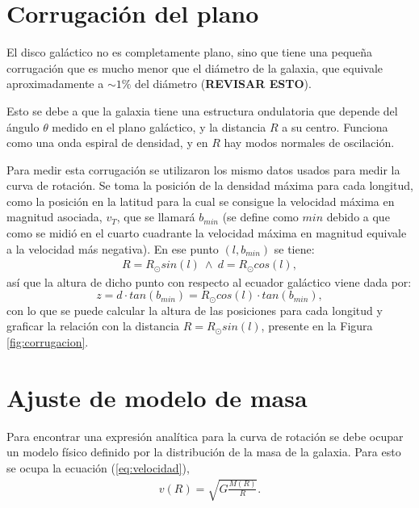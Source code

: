 \documentclass[letterpaper,oneside]{article}
\begin{document}
\section{Corrugación del plano}
El disco galáctico no es completamente plano, sino que tiene una pequeña corrugación que es mucho menor que el diámetro de la galaxia, que equivale aproximadamente a  $\sim 1\%$ del diámetro (\textbf{REVISAR ESTO}).

Esto se debe a que la galaxia tiene una estructura ondulatoria que depende del ángulo $\theta$ medido en el plano galáctico, y la distancia $R$ a su centro. Funciona como una onda espiral de densidad, y en $R$ hay modos normales de oscilación. %

Para medir esta corrugación se utilizaron los mismo datos usados para medir la curva de rotación. Se toma la posición de la densidad máxima para cada longitud, como la posición en la latitud para la cual se consigue la velocidad máxima en magnitud asociada, $v_{T}$, que se llamará $b_{min}$ (se define como $min$ debido a que como se midió en el cuarto cuadrante la velocidad máxima en magnitud equivale a la velocidad más negativa). En ese punto $(l,b_{min})$ se tiene:
\begin{gather*}
R=R_{\odot}sin(l) \ \land \ d=R_{\odot}cos(l),
\end{gather*}
así que la altura de dicho punto con respecto al ecuador galáctico viene dada por:
\begin{equation*}
z=d\cdot tan(b_{min})=R_{\odot}cos(l)\cdot tan(b_{min}),
\end{equation*}
con lo que se puede calcular la altura de las posiciones para cada longitud y graficar la relación con la distancia $R=R_{\odot}sin(l)$, presente en la Figura \ref{fig:corrugacion}.

\section{Ajuste de modelo de masa}
Para encontrar una expresión analítica para la curva de rotación se debe ocupar un modelo físico definido por la distribución de la masa de la galaxia. Para esto se ocupa la ecuación (\ref{eq:velocidad}),
\begin{gather*}
v(R)=\sqrt{G\frac{M(R)}{R}}.
\end{gather*}
\end{document}
